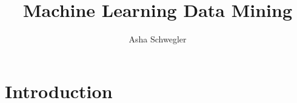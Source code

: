 \documentclass{article}
\title{Machine Learning Data Mining}
\author{Asha Schwegler}
\begin{document}
\maketitle
\tableofcontents
\newpage


\section{Introduction}

\end{document}
